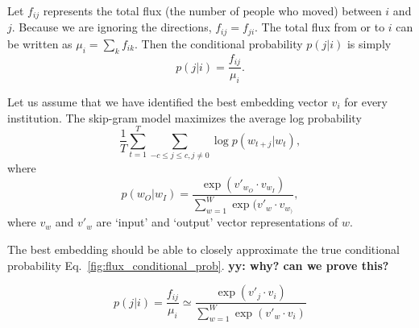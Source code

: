 \documentclass[12pt]{article} %
\def\figdir{../Figs}
\def\yy#1{ {\color{red}\textbf{yy: #1}} }
\begin{document}
Let $f_{ij}$ represents the total flux (the number of people who moved) between $i$ and $j$. 
Because we are ignoring the directions, $f_{ij} = f_{ji}$. 
The total flux from or to $i$ can be written as $\mu_{i} = \sum_k f_{ik}$. 
Then the conditional probability $p(j|i)$ is simply
\begin{equation}\label{fig:flux_conditional_prob}
p(j|i) = \frac{f_{ij}}{\mu_i}. 
\end{equation}

Let us assume that we have identified the best embedding vector $v_i$ for every institution. 
The skip-gram model maximizes the average log probability
\begin{equation}
\frac{1}{T}\sum_{t=1}^{T} \sum_{-c \le j \le c, j \neq 0} \log p(w_{t+j}|w_t),  
\end{equation}
where 
\begin{equation}
p(w_O|w_I) = \frac{\exp(v'_{w_{O} }\cdot v_{w_{I}})}{\sum_{w=1}^{W} \exp(v'_w \cdot v_{w_{)}}}, 
\end{equation}
where $v_w$ and $v'_w$ are `input' and `output' vector representations of $w$. 

The best embedding should be able to closely approximate the true conditional probability Eq.~\ref{fig:flux_conditional_prob}.  \yy{why? can we prove this?} 

\begin{equation}
p(j|i) = \frac{f_{ij}}{\mu_i} \simeq \frac{\exp(v'_j \cdot v_i)}{\sum_{w=1}^{W} \exp(v'_w \cdot v_i)}
\end{equation}




\newpage
\printbibliography{}
    
\end{document}
